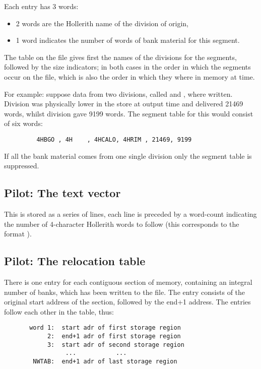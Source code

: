 Each entry has 3 words:

\begin{itemize}
\item    2 words are the Hollerith name of the division of origin,
\item    1 word indicates the number of words of bank material for 
         this segment.
\end{itemize}

The table on the file gives first the names of the divisions
for the segments, followed by the size indicators;
in both cases in the order in which the segments occur on the file,
which is also the order in which they where in memory at  time.

For example: suppose data from two divisions,
called  and , where written.
Division  was physically lower in the store at output time
and delivered 21469 words, whilst division  gave 9199 words.
The segment table for this would consist of six words:

\begin{verbatim}
         4HBGO , 4H    , 4HCALO, 4HRIM , 21469, 9199
\end{verbatim}

If all the bank material comes from one single division only
the segment table is suppressed.

\subsection*{Pilot: The text vector}

This is stored as a series of lines,
each line is preceded by a word-count indicating the number of
4-character Hollerith words to follow (this corresponds to the
 format ).

\subsection*{Pilot: The relocation table}

There is one entry for each contiguous section of memory,
containing an integral number of banks, which has been written
to the file. The entry consists of the original start address
of the section, followed by the end+1 address.
The entries follow each other in the table, thus:

\begin{verbatim}
       word 1:  start adr of first storage region
            2:  end+1 adr of first storage region
            3:  start adr of second storage region
                 ...           ...
        NWTAB:  end+1 adr of last storage region
\end{verbatim}


